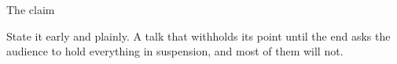 \begin{frame}{The claim}
  \begin{pullquote}
  State it early and plainly. A talk that withholds its point until the end asks the audience
  to hold everything in suspension, and most of them will not.
  \end{pullquote}
\end{frame}
